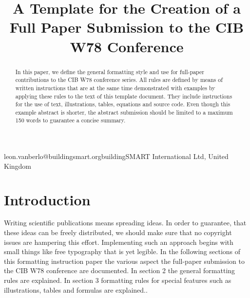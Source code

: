 




\title{A Template for the Creation of a Full Paper Submission to the CIB W78 Conference } 


\newcommand{\shorttitle}{A Template for the CIB W78 Conference }
\newcommand{\authorname}{Author, A. et al.}


\thispagestyle{empty}
\maketitle


 {leon.vanberlo@buildingsmart.org}{buildingSMART International Ltd, United Kingdom}


\begin{abstract}
In this paper, we define the general formatting style and use for full-paper contributions to the CIB W78 conference series. All rules are defined by means of written instructions that are at the same time demonstrated with examples by applying these rules to the text of this template document. They include instructions for the use of text, illustrations, tables, equations and source code. Even though this example abstract is shorter, the abstract submission should be limited to a maximum 150 words to guarantee a concise summary.
\end{abstract}

\section{Introduction}
Writing scientific publications means spreading ideas. In order to guarantee, that these ideas can be freely distributed, we should make sure that no copyright issues are hampering this effort. Implementing such an approach begins with small things like free typography that is yet legible. In the following sections of this formatting instruction paper the various aspect the full-paper submission to the CIB W78 conference are documented. In section 2 the general formatting rules are explained. In section 3 formatting rules for special features such as illustrations, tables and formulas are explained.\parencite{sample_citation1}.

